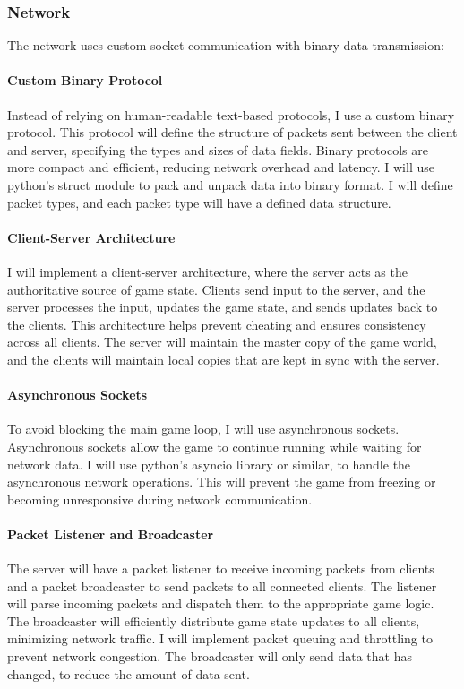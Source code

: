 \documentclass{article}
\begin{document}
\subsubsection{Network}

The network uses custom socket communication with binary data transmission:

\paragraph{Custom Binary Protocol}
Instead of relying on human-readable text-based protocols, I use a custom binary protocol. This protocol will define the structure of packets sent between the client and server, specifying the types and sizes of data fields. Binary protocols are more compact and efficient, reducing network overhead and latency. I will use python's struct module to pack and unpack data into binary format. I will define packet types, and each packet type will have a defined data structure.

\paragraph{Client-Server Architecture}
I will implement a client-server architecture, where the server acts as the authoritative source of game state. Clients send input to the server, and the server processes the input, updates the game state, and sends updates back to the clients. This architecture helps prevent cheating and ensures consistency across all clients. The server will maintain the master copy of the game world, and the clients will maintain local copies that are kept in sync with the server.

\paragraph{Asynchronous Sockets}
To avoid blocking the main game loop, I will use asynchronous sockets. Asynchronous sockets allow the game to continue running while waiting for network data. I will use python's asyncio library or similar, to handle the asynchronous network operations. This will prevent the game from freezing or becoming unresponsive during network communication.

\paragraph{Packet Listener and Broadcaster}
The server will have a packet listener to receive incoming packets from clients and a packet broadcaster to send packets to all connected clients. The listener will parse incoming packets and dispatch them to the appropriate game logic. The broadcaster will efficiently distribute game state updates to all clients, minimizing network traffic. I will implement packet queuing and throttling to prevent network congestion. The broadcaster will only send data that has changed, to reduce the amount of data sent.
\end{document}
